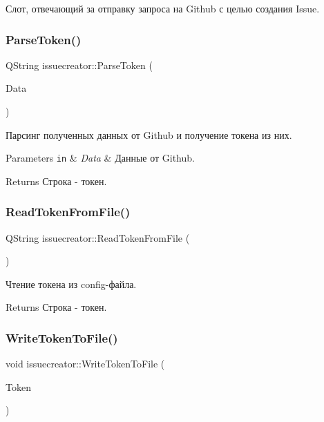 Слот, отвечающий за отправку запроса на Github с целью создания Issue. 

\mbox{\label{classissuecreator_a32184b3842bd6352faeef506b85c649a}} 
\subsubsection{Parse\+Token()}
{\footnotesize\ttfamily Q\+String issuecreator\+::\+Parse\+Token (\begin{DoxyParamCaption}\item[{Q\+String}]{Data }\end{DoxyParamCaption})}



Парсинг полученных данных от Github и получение токена из них. 


\begin{DoxyParams}[1]{Parameters}
\mbox{\tt in}  & {\em Data} & Данные от Github. \\
\hline
\end{DoxyParams}
\begin{DoxyReturn}{Returns}
Строка -\/ токен. 
\end{DoxyReturn}
\mbox{\label{classissuecreator_a52fc815f5dd3099817a1613f4af9de9b}} 
\subsubsection{Read\+Token\+From\+File()}
{\footnotesize\ttfamily Q\+String issuecreator\+::\+Read\+Token\+From\+File (\begin{DoxyParamCaption}{ }\end{DoxyParamCaption})}



Чтение токена из config-\/файла. 

\begin{DoxyReturn}{Returns}
Строка -\/ токен. 
\end{DoxyReturn}
\mbox{\label{classissuecreator_a7d8b501ffe33324bad13029113674d3d}} 
\subsubsection{Write\+Token\+To\+File()}
{\footnotesize\ttfamily void issuecreator\+::\+Write\+Token\+To\+File (\begin{DoxyParamCaption}\item[{const std\+::string \&}]{Token }\end{DoxyParamCaption})}



